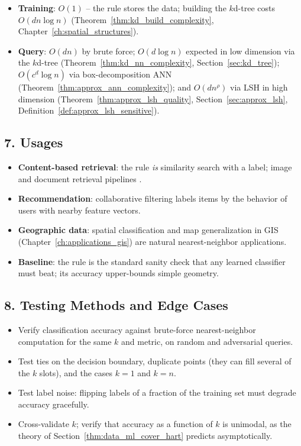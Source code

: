 \begin{itemize}
\item \textbf{Training}: $O(1)$ -- the rule stores the data; building the
  $k$d-tree costs $O(dn \log n)$
  (Theorem~\ref{thm:kd_build_complexity}, Chapter~\ref{ch:spatial_structures}).
\item \textbf{Query}: $O(dn)$ by brute force; $O(d \log n)$ expected in low
  dimension via the $k$d-tree (Theorem~\ref{thm:kd_nn_complexity},
  Section~\ref{sec:kd_tree}); $O(c^d \log n)$ via box-decomposition ANN
  (Theorem~\ref{thm:approx_ann_complexity}); and $O(d n^{\rho})$ via LSH in
  high dimension (Theorem~\ref{thm:approx_lsh_quality},
  Section~\ref{sec:approx_lsh}, Definition~\ref{def:approx_lsh_sensitive}).
\end{itemize}

\subsection{7. Usages}

\begin{itemize}
\item \textbf{Content-based retrieval}: the rule \emph{is} similarity search
  with a label; image and document retrieval pipelines
  \cite{shakhnarovich2006}.
\item \textbf{Recommendation}: collaborative filtering labels items by the
  behavior of users with nearby feature vectors.
\item \textbf{Geographic data}: spatial classification and map generalization
  in GIS (Chapter~\ref{ch:applications_gis}) are natural nearest-neighbor
  applications.
\item \textbf{Baseline}: the rule is the standard sanity check that any
  learned classifier must beat; its accuracy upper-bounds simple geometry.
\end{itemize}

\subsection{8. Testing Methods and Edge Cases}

\begin{itemize}
\item Verify classification accuracy against brute-force nearest-neighbor
  computation for the same $k$ and metric, on random and adversarial
  queries.
\item Test ties on the decision boundary, duplicate points (they can fill
  several of the $k$ slots), and the cases $k = 1$ and $k = n$.
\item Test label noise: flipping labels of a fraction of the training set
  must degrade accuracy gracefully.
\item Cross-validate $k$; verify that accuracy as a function of $k$ is
  unimodal, as the theory of Section~\ref{thm:data_ml_cover_hart} predicts
  asymptotically.
\end{itemize}

